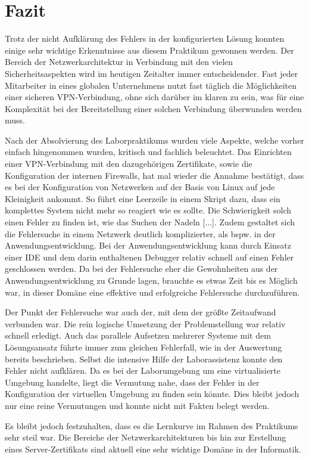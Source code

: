 \documentclass[
a4paper,     %
 headsepline, %
footsepline, %
titlepage,   %
 halfparskip,     %
 fleqn,       %
12pt         %
]{scrartcl}  %
\begin{document}
\section{Fazit}\label{Fazit}
Trotz der nicht Aufklärung des Fehlers in der konfigurierten Lösung konnten einige sehr wichtige Erkenntnisse aus diesem Praktikum gewonnen werden. Der Bereich der Netzwerkarchitektur in Verbindung mit den vielen Sicherheitsaspekten wird im heutigen Zeitalter immer entscheidender. Fast jeder Mitarbeiter in eines globalen Unternehmens nutzt fast täglich die Möglichkeiten einer sicheren VPN-Verbindung, ohne sich darüber im klaren zu sein, was für eine Komplexität bei der Bereitstellung einer solchen Verbindung überwunden werden muss. 

Nach der Absolvierung des Laborpraktikums wurden viele Aspekte, welche vorher einfach hingenommen wurden, kritisch und fachlich beleuchtet. Das Einrichten einer VPN-Verbindung mit den dazugehörigen Zertifikate, sowie die Konfiguration der internen Firewalls, hat mal wieder die Annahme bestätigt, dass es bei der Konfiguration von Netzwerken auf der Basis von Linux auf jede Kleinigkeit ankommt. So führt eine Leerzeile in einem Skript dazu, dass ein komplettes System nicht mehr so reagiert wie es sollte. Die Schwierigkeit solch einen Fehler zu finden ist, wie das Suchen der Nadeln [...]. Zudem gestaltet sich die Fehlersuche in einem Netzwerk deutlich komplizierter, als bspw. in der Anwendungsentwicklung. Bei der Anwendungsentwicklung kann durch Einsatz einer IDE und dem darin enthaltenen Debugger relativ schnell auf einen Fehler geschlossen werden. Da bei der Fehlersuche eher die Gewohnheiten aus der Anwendungsentwicklung zu Grunde lagen, brauchte es etwas Zeit bis es Möglich war, in dieser Domäne eine effektive und erfolgreiche Fehlersuche durchzuführen. 

Der Punkt der Fehlersuche war auch der, mit dem der größte Zeitaufwand verbunden war. Die rein logische Umsetzung der Problemstellung war relativ schnell erledigt. Auch das parallele Aufsetzen mehrerer Systeme mit dem Lösungsansatz führte immer zum gleichen Fehlerfall, wie in der Auswertung bereits beschrieben. Selbst die intensive Hilfe der Laborassistenz konnte den Fehler nicht aufklären. Da es bei der Laborumgebung um eine virtualisierte Umgebung handelte, liegt die Vermutung nahe, dass der Fehler in der Konfiguration der virtuellen Umgebung zu finden sein könnte. Dies bleibt jedoch nur eine reine Vermutungen und konnte nicht mit Fakten belegt werden. 

Es bleibt jedoch festzuhalten, dass es die Lernkurve im Rahmen des Praktikums sehr steil war. Die Bereiche der Netzwerkarchitekturen bis hin zur Erstellung eines Server-Zertifikats sind aktuell eine sehr wichtige Domäne in der Informatik. 
\end{document}
